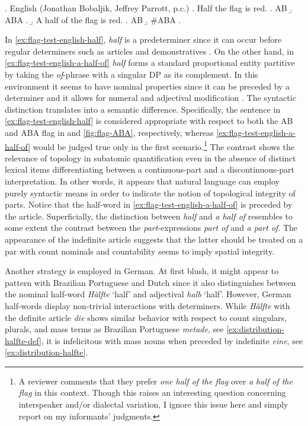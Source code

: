 		\ex.\label{ex:flag-test-english} English (Jonathan Bobaljik, Jeffrey Parrott, p.c.)
        \a. Half the flag is red.\label{ex:flag-test-english-half}
		\a. AB
		\b. ABA
		\z.
		\b. A half of the flag is red.\label{ex:flag-test-english-a-half-of}
		\a. AB
		\b. \#ABA
		\z.

In \ref{ex:flag-test-english-half}, \textit{half} is a predeterminer since it can occur before regular determiners such as articles and demonstratives \citep[pp. 257--258]{quirk_greenbaum_leech_svartvik1985comprehensive}. On the other hand, in \ref{ex:flag-test-english-a-half-of} \textit{half} forms a standard proportional entity partitive by taking the \textit{of}-phrase with a singular DP as its complement. In this environment it seems to have nominal properties since it can be preceded by a determiner and it allows for numeral and adjectival modification \citep[p. 434]{huddleston_pullum2002cambridge}. The syntactic distinction translates into a semantic difference. Specifically, the sentence in \ref{ex:flag-test-english-half} is considered appropriate with respect to both the AB and ABA flag in  and \ref{fig:flag-ABA}, respectively, whereas \ref{ex:flag-test-english-a-half-of} would be judged true only in the first scenario.\footnote{A reviewer comments that they prefer \textit{one half of the flag} over \textit{a half of the flag} in this context. Though this raises an interesting question concerning interspeaker and/or dialectal variation, I ignore this issue here and simply report on my informants' judgments.} The contrast shows the relevance of topology in subatomic quantification even in the absence of distinct lexical items differentiating between a continuous-part and a discontinuous-part interpretation. In other words, it appears that natural language can employ purely syntactic means in order to indicate the notion of topological integrity of parts. Notice that the half-word in \ref{ex:flag-test-english-a-half-of} is preceded by the article. Superficially, the distinction between \textit{half} and \textit{a half of} resembles to some extent the contrast between the \textit{part}-expressions \textit{part of} and \textit{a part of}. The appearance of the indefinite article suggests that the latter should be treated on a par with count nominals and countability seems to imply spatial integrity.\largerpage

Another strategy is employed in German. At first blush, it might appear to pattern with Brazilian Portuguese and Dutch since it also distinguishes between the nominal half-word \textit{Hälfte} `half' and adjectival \textit{halb} `half'. However, German half-words display non-trivial interactions with determiners. While \textit{Hälfte} with the definite article \textit{die} shows similar behavior with respect to count singulars, plurals, and mass terms as Brazilian Portuguese \textit{metade}, see \ref{ex:distribution-halfte-def}, it is infelicitous with mass nouns when preceded by indefinite \textit{eine}, see \ref{ex:distribution-halfte}. 

